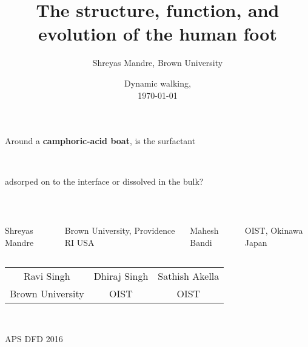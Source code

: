 \documentclass[compress,10pt,dvipsnames,svgnames,pdftex]{beamer}
\title{The structure, function, and evolution of the human foot}
\author{Shreyas Mandre, Brown University}
\date{Dynamic walking, \\ \scriptsize \today }
\begin{document}
\begin{frame}

\centerline{\Large Around a {\bf camphoric-acid boat}, is the surfactant}
~\\[1mm]
\centerline{\Large adsorped on to the interface or dissolved in the bulk?}
~ \\[1mm]
\begin{columns}
\column{4.25cm}
\centerline{\small Shreyas Mandre}
\centerline{\scriptsize Brown University, Providence RI USA}
\column{4.25cm}
\centerline{\small Mahesh Bandi}
\centerline{\scriptsize OIST, Okinawa Japan}
\end{columns}
\begin{center}
\begin{tabular}{ccc}
{\scriptsize Ravi Singh} &
{\scriptsize Dhiraj Singh} &
{\scriptsize Sathish Akella} \\
{\scriptsize Brown University} &
{\scriptsize OIST} &
{\scriptsize OIST}
\end{tabular}
\end{center}
~ \\[1mm]

\centerline{\small APS DFD 2016}
\end{frame}
\end{document}
